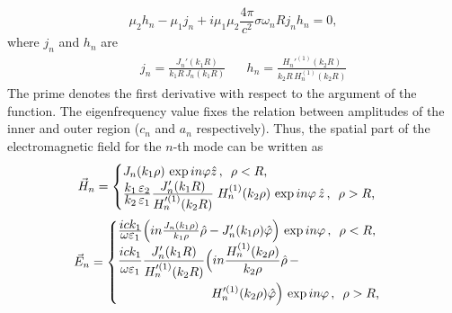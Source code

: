 \documentclass[9pt,twocolumn,twoside]{osajnl}
\begin{document}
\begin{equation}
\mu_2h_n-\mu_1j_n+  i\mu_1\mu_2 \frac{4\pi}{c^2}\sigma  \omega_n R  j_n h_n =0, \label{eq:disp01}
\end{equation}
where $j_n$ and $h_n$ are
\begin{eqnarray}
&& j_n=\frac{J_n'(k_1 R)}{k_1 R \, J_n(k_1 R)} \,\,\,\,\,\,\,\,\,\, h_n=\frac{H_n'^{(1)}(k_2 R)}{k_2 R \, H_n^{(1)}(k_2 R)} 
\end{eqnarray}
%
The prime denotes the first derivative with respect to the argument of the function.
The eigenfrequency value fixes the relation between amplitudes of the inner and outer region ($c_{n}$  and $a_{n}$ respectively). 
Thus, the spatial part of the electromagnetic field for the \mbox{$n$-th} mode can be written as 
%
\begin{equation} 
\vec H_{n}=   
\begin{cases} 
J_n(k_1\rho)\,\exp{i n\varphi} \hat z \,, \text{\, $\rho < R$,}         \\
\frac{{\textstyle k_1\,\varepsilon_2}}{{\textstyle k_2\,\varepsilon_1}}\frac{{\textstyle J_n'(k_1R)}}{{\textstyle H_n'^{(1)}(k_2R)}}\;H_n^{(1)}(k_2\rho) \,\exp{in\varphi}\,\hat z\,, \text{\, $\rho > R$,}
\end{cases}      \label{campoph1}
\end{equation}
%
\begin{equation} 
{\vec E}_n= 
\begin{cases} 
\frac{\textstyle ic k_1}{\textstyle \omega\varepsilon_1}  \Bigl(in \frac{J_n(k_1\rho)}{k_1\rho}\hat{\rho}- J_n'(k_1\rho)\hat{\varphi}\Bigr) \,\exp{i n\varphi} 
\,, \text{\, $\rho < R$,}         \\
\begin{split}
\frac{\textstyle ic k_1}{\textstyle \omega\varepsilon_1} \frac{\textstyle J_n'(k_1R)}{\textstyle H_n'^{(1)}(k_2R)}& \Bigl(in \frac{\textstyle H_n^{(1)}(k_2\rho)}{k_2\rho}\hat{\rho} \,- \\
&\,\,\, H_n'^{(1)}(k_2\rho)\hat{\varphi}\Bigr) \,\exp{i n\varphi} \,, \text{\, $\rho > R$,}
\end{split}
\end{cases}      \label{campope1}
\end{equation}
%
%
 
\end{document}
